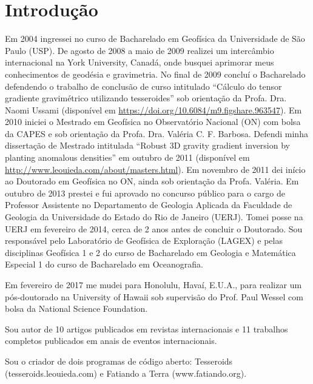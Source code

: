 \section{Introdução}


Em 2004 ingressei no curso de Bacharelado em Geofísica da Universidade de São
Paulo (USP).
De agosto de 2008 a maio de 2009 realizei um intercâmbio internacional na York
University, Canadá, onde busquei aprimorar meus conhecimentos de geodésia e
gravimetria.
No final de 2009 concluí o Bacharelado defendendo o trabalho de conclusão de
curso intitulado ``Cálculo do tensor gradiente gravimétrico utilizando
tesseroides'' sob orientação da Profa. Dra. Naomi Ussami
(disponível em \url{https://doi.org/10.6084/m9.figshare.963547}).
Em 2010 iniciei o Mestrado em Geofísica no Observatório Nacional (ON) com bolsa
da CAPES e sob orientação da Profa. Dra. Valéria C. F. Barbosa.
Defendi minha dissertação de Mestrado intitulada ``Robust 3D gravity gradient
inversion by planting anomalous densities'' em outubro de 2011 (disponível em
\url{http://www.leouieda.com/about/masters.html}).
Em novembro de 2011 dei início ao Doutorado em Geofísica no ON, ainda sob
orientação da Profa. Valéria.
Em outubro de 2013 prestei e fui aprovado no concurso público para o cargo de
Professor Assistente no Departamento de Geologia Aplicada da Faculdade de
Geologia da Universidade do Estado do Rio de Janeiro (UERJ).
Tomei posse na UERJ em fevereiro de 2014, cerca de 2 anos antes de concluir o
Doutorado.
Sou responsável pelo Laboratório de Geofísica de Exploração (LAGEX) e pelas
disciplinas Geofísica 1 e 2 do curso de Bacharelado em Geologia e Matemática
Especial 1 do curso de Bacharelado em Oceanografia.

Em fevereiro de 2017 me mudei para Honolulu, Havaí, E.U.A., para realizar um
pós-doutorado na University of Hawaii sob supervisão do Prof. Paul Wessel com
bolsa da National Science Foundation.

Sou autor de 10 artigos publicados em revistas internacionais e 11 trabalhos
completos publicados em anais de eventos internacionais.

Sou o criador de dois programas de código aberto: Tesseroids
(tesseroids.leouieda.com) e Fatiando a Terra (www.fatiando.org).

